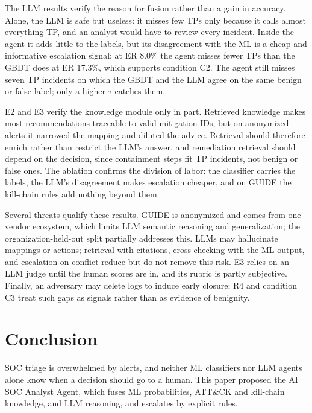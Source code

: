 \documentclass[conference]{IEEEtran}
\begin{document}
The LLM results verify the reason for fusion rather than a gain in
accuracy. Alone, the LLM is safe but useless: it misses few TPs only
because it calls almost everything TP, and an analyst would have to
review every incident. Inside the agent it adds little to the labels,
but its disagreement with the ML is a cheap and informative escalation
signal: at ER 8.0\% the agent misses fewer TPs than the GBDT does at
ER 17.3\%, which supports condition C2. The agent still misses seven
TP incidents on which the GBDT and the LLM agree on the same benign or
false label; only a higher $\tau$ catches them.

E2 and E3 verify the knowledge module only in part. Retrieved
knowledge makes most recommendations traceable to valid mitigation
IDs, but on anonymized alerts it narrowed the mapping and diluted the
advice. Retrieval should therefore enrich rather than
restrict the LLM's answer, and remediation retrieval should depend on
the decision, since containment steps fit TP incidents, not benign or
false ones. The ablation confirms the division of labor: the
classifier carries the labels, the LLM's disagreement makes escalation
cheaper, and on GUIDE the kill-chain rules add nothing beyond them.

Several threats qualify these results. GUIDE is anonymized and comes
from one vendor ecosystem, which limits LLM semantic reasoning and
generalization; the organization-held-out split partially
addresses this. LLMs may hallucinate mappings or actions;
retrieval with citations, cross-checking with the ML output, and
escalation on conflict reduce but do not remove this risk. E3 relies
on an LLM judge until the human scores are in, and its rubric is
partly subjective. Finally, an adversary may delete
logs to induce early closure; R4 and condition C3 treat such gaps as
signals rather than as evidence of benignity.

\section{Conclusion}\label{sec:concl}

SOC triage is overwhelmed by alerts, and neither ML classifiers nor
LLM agents alone know when a decision should go to a human. This paper
proposed the AI SOC Analyst Agent, which fuses ML probabilities,
ATT\&CK and kill-chain knowledge, and LLM reasoning, and escalates by
explicit rules.
\end{document}

